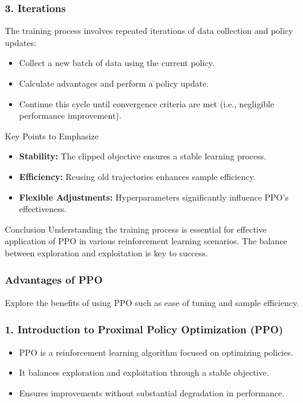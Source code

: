 \documentclass{beamer}
\begin{document}
\begin{frame}[fragile]
    \frametitle{3. Iterations}
    The training process involves repeated iterations of data collection and policy updates:
    \begin{itemize}
        \item Collect a new batch of data using the current policy.
        \item Calculate advantages and perform a policy update.
        \item Continue this cycle until convergence criteria are met (i.e., negligible performance improvement).
    \end{itemize}
    
    \begin{block}{Key Points to Emphasize}
        \begin{itemize}
            \item \textbf{Stability:} The clipped objective ensures a stable learning process.
            \item \textbf{Efficiency:} Reusing old trajectories enhances sample efficiency.
            \item \textbf{Flexible Adjustments:} Hyperparameters significantly influence PPO's effectiveness.
        \end{itemize}
    \end{block}

    \begin{block}{Conclusion}
        Understanding the training process is essential for effective application of PPO in various reinforcement learning scenarios. 
        The balance between exploration and exploitation is key to success.
    \end{block}
\end{frame}

\begin{frame}
    \frametitle{Advantages of PPO}
    Explore the benefits of using PPO such as ease of tuning and sample efficiency.
\end{frame}

\begin{frame}
    \frametitle{1. Introduction to Proximal Policy Optimization (PPO)}
    \begin{itemize}
        \item PPO is a reinforcement learning algorithm focused on optimizing policies.
        \item It balances exploration and exploitation through a stable objective.
        \item Ensures improvements without substantial degradation in performance.
    \end{itemize}
\end{frame}
\end{document}
